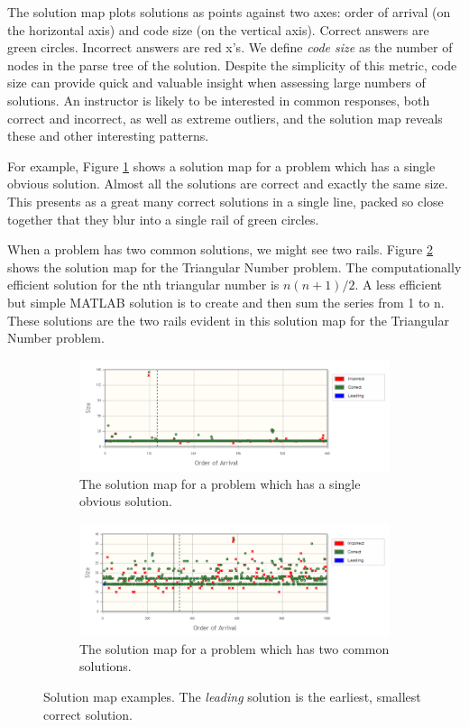 \documentclass[12pt]{article}
\begin{document}
The solution map plots solutions as points against two axes: order of arrival (on the horizontal axis) and code size (on the vertical axis). Correct answers are green circles. Incorrect answers are red x's. We define \textit{code size} as the number of nodes in the parse tree of the solution. Despite the simplicity of this metric, code size can provide quick and valuable insight when assessing large numbers of solutions. An instructor is likely to be interested in common responses, both correct and incorrect, as well as extreme outliers, and the solution map reveals these and other interesting patterns.
 
For example, Figure \ref{nedfig1} shows a solution map for a problem which has a single obvious solution. Almost all the solutions are correct and exactly the same size. This presents as a great many correct solutions in a single line, packed so close together that they blur into a single rail of green circles.

When a problem has two common solutions, we might see two rails. Figure \ref{nedfig2} shows the solution map for the Triangular Number problem. The computationally efficient solution for the nth triangular number is $n(n+1)/2$. A less efficient but simple MATLAB solution is to create and then sum the series from 1 to n. These solutions are the two rails evident in this solution map for the Triangular Number problem.

\begin{figure}[p]
\centering
\begin{subfigure}[b]{1.0\textwidth}
	\centering
\includegraphics[scale=0.65]{nedfig1.png}
\caption{The solution map for a problem which has a single obvious solution.}
\label{nedfig1}
\end{subfigure}
\begin{subfigure}[b]{1.0\textwidth}
	\centering
\includegraphics[scale=0.65]{nedfig2.png}
\caption{The solution map for a problem which has two common solutions.}
\label{nedfig2}
\end{subfigure}
\label{nedfigsAll}
\caption{Solution map examples. The \textit{leading} solution is the earliest, smallest correct solution.}
\end{figure}
\end{document}
